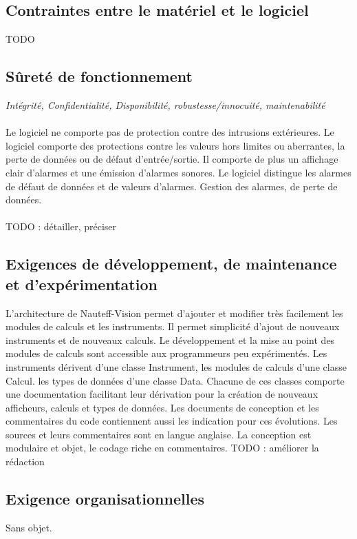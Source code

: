 \documentclass[a4paper,11pt]{report}
\begin{document}
\subsection{Contraintes entre le matériel et le logiciel}
TODO
\subsection{Sûreté de fonctionnement}
\textit{Intégrité, Confidentialité, Disponibilité, robustesse/innocuité, maintenabilité}
\paragraph{}
Le logiciel ne comporte pas de protection contre des intrusions extérieures.
Le logiciel comporte des protections contre
les valeurs hors limites ou aberrantes,
la perte de données ou de défaut d'entrée/sortie.
Il comporte de plus un affichage clair d'alarmes et une émission d'alarmes sonores.
Le logiciel distingue les alarmes de défaut de données et de valeurs d'alarmes.
Gestion des alarmes, de perte de données.
\paragraph{}
TODO : détailler, préciser

\subsection{Exigences de développement, de maintenance et d'expérimentation}

L'architecture de Nauteff-Vision permet d'ajouter et modifier très facilement
les modules de calculs et les instruments.
Il permet simplicité d'ajout de nouveaux instruments et de nouveaux calculs.
Le développement et la mise au point des modules de calculs sont accessible aux programmeurs peu expérimentés.
Les instruments dérivent d'une classe Instrument,
les modules de calculs d'une classe Calcul.
les types de données d'une classe Data.
Chacune de ces classes comporte une documentation facilitant leur dérivation
pour la création de nouveaux afficheurs, calculs et types de données.
Les documents de conception et les commentaires du code
contiennent aussi les indication pour ces évolutions.
Les sources et leurs commentaires sont en langue anglaise.
La conception est modulaire et objet, le codage riche en commentaires.
TODO : améliorer la rédaction

\subsection{Exigence organisationnelles}
Sans objet.
\end{document}
